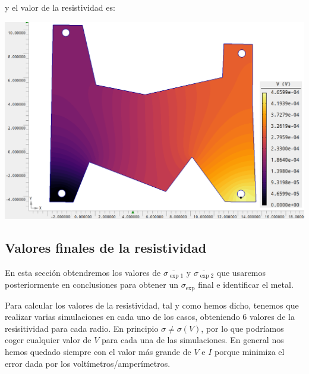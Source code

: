 \documentclass[11pt]{article}
\begin{document}
y el valor de la resistividad es: \\[1em]
\begin{minipage}[t]{0.45\linewidth} 
	\begin{center}
	\vspace{0.5em}
	
	\vspace{1.2em}
	\vspace{0.5em}
	
	\end{center}  
\end{minipage}
\hfill
\begin{minipage}[t]{0.45\linewidth}
	\begin{center}
	\includegraphics[width=1\linewidth]{Imagen Agros 1/Agros6.png}
	\end{center}  	
\end{minipage}



\subsection{Valores finales de la resistividad}

En esta sección obtendremos los valores de $\overline{\sigma_{\exp 1}}$ y $\overline{\sigma_{\exp 2}}$ que usaremos posteriormente en conclusiones para obtener un $\sigma_{\exp}$ final e identificar el metal. 

Para calcular los valores de la resistividad, tal y como hemos dicho, tenemos que realizar varias simulaciones en cada uno de los casos, obteniendo 6 valores de la resisitividad para cada radio. En principio $\sigma \neq \sigma (V)$, por lo que podríamos coger cualquier valor de $V$ para cada una de las simulaciones. En general nos hemos quedado siempre con el valor más grande de $V$ e $I$ porque minimiza el error dada por los voltímetros/amperímetros. \newpage
\end{document}
